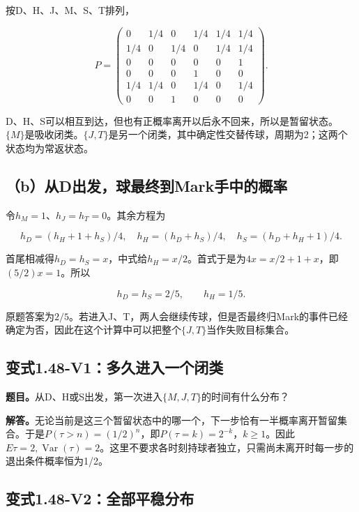 \documentclass[
  11pt,
  a4paper,
  UTF8,
  fontset=fandol]{ctexart}
\begin{document}
按D、H、J、M、S、T排列，

\[
\boxed{P=\begin{pmatrix}
0&1/4&0&1/4&1/4&1/4\\
1/4&0&1/4&0&1/4&1/4\\
0&0&0&0&0&1\\
0&0&0&1&0&0\\
1/4&1/4&0&1/4&0&1/4\\
0&0&1&0&0&0
\end{pmatrix}.}
\]

D、H、S可以相互到达，但也有正概率离开以后永不回来，所以是暂留状态。\(\{M\}\)是吸收闭类。\(\{J,T\}\)是另一个闭类，其中确定性交替传球，周期为2；这两个状态均为常返状态。

\subsection{（b）从D出发，球最终到Mark手中的概率}\label{bux4ecedux51faux53d1ux7403ux6700ux7ec8ux5230markux624bux4e2dux7684ux6982ux7387}

令\(h_M=1\)、\(h_J=h_T=0\)。其余方程为

\[
h_D=(h_H+1+h_S)/4,\quad
h_H=(h_D+h_S)/4,\quad
h_S=(h_D+h_H+1)/4.
\]

首尾相减得\(h_D=h_S=x\)，中式给\(h_H=x/2\)。首式于是为\(4x=x/2+1+x\)，即\((5/2)x=1\)。所以

\[
\boxed{h_D=h_S=2/5,\qquad h_H=1/5.}
\]

原题答案为\(\boxed{2/5}\)。若进入J、T，两人会继续传球，但是否最终归Mark的事件已经确定为否，因此在这个计算中可以把整个\(\{J,T\}\)当作失败目标集合。

\subsection{变式1.48-V1：多久进入一个闭类}\label{ux53d8ux5f0f1.48-v1ux591aux4e45ux8fdbux5165ux4e00ux4e2aux95edux7c7b}

\textbf{题目。}从D、H或S出发，第一次进入\(\{M,J,T\}\)的时间有什么分布？

\textbf{解答。}无论当前是这三个暂留状态中的哪一个，下一步恰有一半概率离开暂留集合。于是\(P(\tau>n)=(1/2)^n\)，即\(P(\tau=k)=2^{-k}\)，\(k\ge1\)。因此\(\boxed{E\tau=2,\operatorname{Var}(\tau)=2}\)。这里不要求各时刻持球者独立，只需尚未离开时每一步的退出条件概率恒为1/2。

\subsection{变式1.48-V2：全部平稳分布}\label{ux53d8ux5f0f1.48-v2ux5168ux90e8ux5e73ux7a33ux5206ux5e03}
\end{document}
